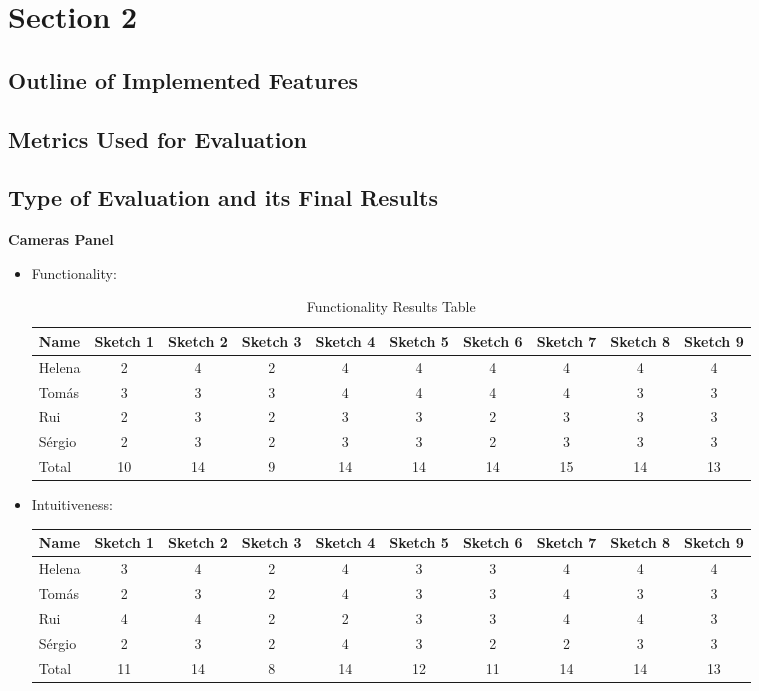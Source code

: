 \chapter{Section 2} \label{section2}
\section{Outline of Implemented Features}
\section{Metrics Used for Evaluation}
\section{Type of Evaluation and its Final Results}
\textbf{Cameras Panel}
\begin{itemize}
    \item Functionality: 
\begin{table}[H]
\begin{tabular}{l*{9}{c}}
Name & Sketch 1 & Sketch 2 & Sketch 3 & Sketch 4 
& Sketch 5 & Sketch 6 & Sketch 7 & Sketch 8 & Sketch 9 \\
\hline 
Helena & 2 & 4 & 2 & 4 & 4 & 4 & 4 & 4 & 4 \\
Tomás & 3 & 3 & 3 & 4 & 4 & 4 & 4 & 3 & 3 \\ 
Rui & 2 & 3 & 2 & 3 & 3 & 2 & 3 & 3 & 3 \\ 
Sérgio & 2 & 3 & 2 & 3 & 3 & 2 & 3 & 3 & 3 \\ 
Total & 10 & 14 & 9 & 14 & 14 & 14 & 15 & 14 & 13 \\
\end{tabular}
\caption{Functionality Results Table}
\end{table}
\item Intuitiveness: 
\begin{table}[H]
\begin{tabular}{l*{9}{c}}
    Name & Sketch 1 & Sketch 2 & Sketch 3 & Sketch 4 
    & Sketch 5 & Sketch 6 & Sketch 7 & Sketch 8 & Sketch 9 \\
    \hline 
    Helena & 3 & 4 & 2 & 4 & 3 & 3 & 4 & 4 & 4 \\
    Tomás & 2 & 3 & 2 & 4 & 3 & 3 & 4 & 3 & 3 \\ 
    Rui & 4 & 4 & 2 & 2 & 3 & 3 & 4 & 4 & 3 \\ 
    Sérgio & 2 & 3 & 2 & 4 & 3 & 2 & 2 & 3 & 3 \\ 
    Total & 11 & 14 & 8 & 14 & 12 & 11 & 14 & 14 & 13 \\

\end{tabular}
\end{table}
\end{itemize}
